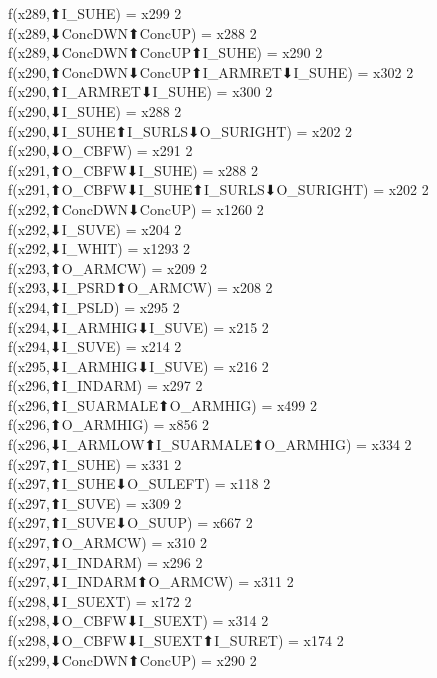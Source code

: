 f(x289,⬆I_SUHE) = x299 {2} \\
f(x289,⬇ConcDWN⬆ConcUP) = x288 {2} \\
f(x289,⬇ConcDWN⬆ConcUP⬆I_SUHE) = x290 {2} \\
f(x290,⬆ConcDWN⬇ConcUP⬆I_ARMRET⬇I_SUHE) = x302 {2} \\
f(x290,⬆I_ARMRET⬇I_SUHE) = x300 {2} \\
f(x290,⬇I_SUHE) = x288 {2} \\
f(x290,⬇I_SUHE⬆I_SURLS⬇O_SURIGHT) = x202 {2} \\
f(x290,⬇O_CBFW) = x291 {2} \\
f(x291,⬆O_CBFW⬇I_SUHE) = x288 {2} \\
f(x291,⬆O_CBFW⬇I_SUHE⬆I_SURLS⬇O_SURIGHT) = x202 {2} \\
f(x292,⬆ConcDWN⬇ConcUP) = x1260 {2} \\
f(x292,⬇I_SUVE) = x204 {2} \\
f(x292,⬇I_WHIT) = x1293 {2} \\
f(x293,⬆O_ARMCW) = x209 {2} \\
f(x293,⬇I_PSRD⬆O_ARMCW) = x208 {2} \\
f(x294,⬆I_PSLD) = x295 {2} \\
f(x294,⬇I_ARMHIG⬇I_SUVE) = x215 {2} \\
f(x294,⬇I_SUVE) = x214 {2} \\
f(x295,⬇I_ARMHIG⬇I_SUVE) = x216 {2} \\
f(x296,⬆I_INDARM) = x297 {2} \\
f(x296,⬆I_SUARMALE⬆O_ARMHIG) = x499 {2} \\
f(x296,⬆O_ARMHIG) = x856 {2} \\
f(x296,⬇I_ARMLOW⬆I_SUARMALE⬆O_ARMHIG) = x334 {2} \\
f(x297,⬆I_SUHE) = x331 {2} \\
f(x297,⬆I_SUHE⬇O_SULEFT) = x118 {2} \\
f(x297,⬆I_SUVE) = x309 {2} \\
f(x297,⬆I_SUVE⬇O_SUUP) = x667 {2} \\
f(x297,⬆O_ARMCW) = x310 {2} \\
f(x297,⬇I_INDARM) = x296 {2} \\
f(x297,⬇I_INDARM⬆O_ARMCW) = x311 {2} \\
f(x298,⬇I_SUEXT) = x172 {2} \\
f(x298,⬇O_CBFW⬇I_SUEXT) = x314 {2} \\
f(x298,⬇O_CBFW⬇I_SUEXT⬆I_SURET) = x174 {2} \\
f(x299,⬇ConcDWN⬆ConcUP) = x290 {2} \\
